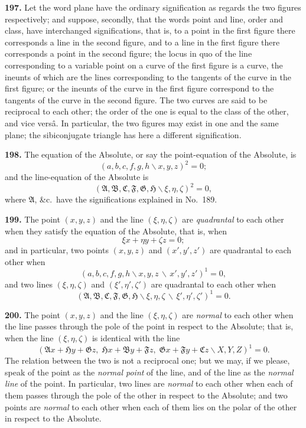 \documentclass[11pt,a4paper]{book}
\begin{document}
\begin{center}
\textbf{197.} Let the word plane have the ordinary signification as regards the two figures
respectively; and suppose, secondly, that the words point and line, order and class,
have interchanged significations, that is, to a point in the first figure there corresponds
a line in the second figure, and to a line in the first figure there corresponds a point
in the second figure; the locus in quo of the line corresponding to a variable point
on a curve of the first figure is a curve, the ineunts of which are the lines corresponding
to the tangents of the curve in the first figure; or the ineunts of the curve in the first
figure correspond to the tangents of the curve in the second figure. The two curves
are said to be reciprocal to each other; the order of the one is equal to the class of the
other, and vice vers\^{a}. In particular, the two figures may exist in one and the same
plane; the sibiconjugate triangle has here a different signification.

\textbf{198.} The equation of the Absolute, or say the point-equation of the Absolute, is
\[
(a,b,c,f,g,h\!\backslash x,y,z)^2 = 0;
\]
and the line-equation of the Absolute is
\[
(\mathfrak{A},\mathfrak{B},\mathfrak{C},\mathfrak{F},\mathfrak{G},\mathfrak{H}\!\backslash \xi,\eta,\zeta)^2 = 0,
\]
where $\mathfrak{A}$, \&c.\ have the significations explained in No.~189.

\textbf{199.} The point $(x,y,z)$ and the line $(\xi,\eta,\zeta)$ are \textit{quadrantal} to each other
when they satisfy the equation of the Absolute, that is, when
\[
\xi x + \eta y + \zeta z = 0;
\]
and in particular, two points $(x,y,z)$ and $(x',y',z')$ are quadrantal to each other when
\[
(a,b,c,f,g,h\!\backslash x,y,z\,\backslash\,x',y',z')^1 = 0,
\]
and two lines $(\xi,\eta,\zeta)$ and $(\xi',\eta',\zeta')$ are quadrantal to each other when
\[
(\mathfrak{A},\mathfrak{B},\mathfrak{C},\mathfrak{F},\mathfrak{G},\mathfrak{H}\!\backslash \xi,\eta,\zeta\,\backslash\,\xi',\eta',\zeta')^1 = 0.
\]

\textbf{200.} The point $(x,y,z)$ and the line $(\xi,\eta,\zeta)$ are \textit{normal} to each other when
the line passes through the pole of the point in respect to the Absolute; that is, when
the line $(\xi,\eta,\zeta)$ is identical with the line
\[
(\mathfrak{A}x+\mathfrak{H}y+\mathfrak{G}z,\; \mathfrak{H}x+\mathfrak{B}y+\mathfrak{F}z,\; \mathfrak{G}x+\mathfrak{F}y+\mathfrak{C}z\!\backslash X,Y,Z)^1 = 0.
\]
The relation between the two is not a reciprocal one; but we may, if we please,
speak of the point as the \textit{normal point} of the line, and of the line as the \textit{normal line} of
the point. In particular, two lines are \textit{normal} to each other when each of them passes
through the pole of the other in respect to the Absolute; and two points are \textit{normal}
to each other when each of them lies on the polar of the other in respect to the
Absolute.


\end{center}
\end{document}
